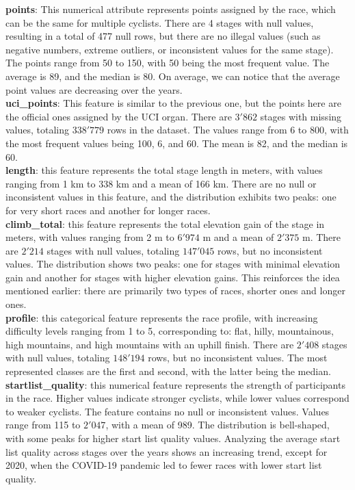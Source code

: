 \noindent \textbf{points}: 
This numerical attribute represents points assigned by the race, which can be the same for multiple cyclists. There are 4 stages with null values, resulting in a total of 477 null rows, but there are no illegal values (such as negative numbers, extreme outliers, or inconsistent values for the same stage). The points range from 50 to 150, with 50 being the most frequent value. The average is 89, and the median is 80.
On average, we can notice that the average point values are decreasing over the years.\\ 

\noindent \textbf{uci\_points}: This feature is similar to the previous one, but the points here are the official ones assigned by the UCI organ. There are $3'862$ stages with missing values, totaling $338'779$ rows in the dataset. The values range from 6 to 800, with the most frequent values being 100, 6, and 60. The mean is 82, and the median is 60.\\

\noindent \textbf{length}: this feature represents the total stage length in meters, with values ranging from 1 km to 338 km and a mean of 166 km. There are no null or inconsistent values in this feature, and the distribution exhibits two peaks: one for very short races and another for longer races. \\

\noindent \textbf{climb\_total}: this feature represents the total elevation gain of the stage in meters, with values ranging from 2 m to $6'974$ m and a mean of $2'375$ m. There are $2'214$ stages with null values, totaling $147'045$ rows, but no inconsistent values. The distribution shows two peaks: one for stages with minimal elevation gain and another for stages with higher elevation gains. This reinforces the idea mentioned earlier: there are primarily two types of races, shorter ones and longer ones.\\

\noindent \textbf{profile}: this categorical feature represents the race profile, with increasing difficulty levels ranging from 1 to 5, corresponding to: flat, hilly, mountainous, high mountains, and high mountains with an uphill finish. There are $2'408$ stages with null values, totaling $148'194$ rows, but no inconsistent values. The most represented classes are the first and second, with the latter being the median. \\

\noindent \textbf{startlist\_quality}: this numerical feature represents the strength of participants in the race. Higher values indicate stronger cyclists, while lower values correspond to weaker cyclists. The feature contains no null or inconsistent values. Values range from 115 to $2'047$, with a mean of 989. The distribution is bell-shaped, with some peaks for higher start list quality values. Analyzing the average start list quality across stages over the years shows an increasing trend, except for 2020, when the COVID-19 pandemic led to fewer races with lower start list quality. \\

